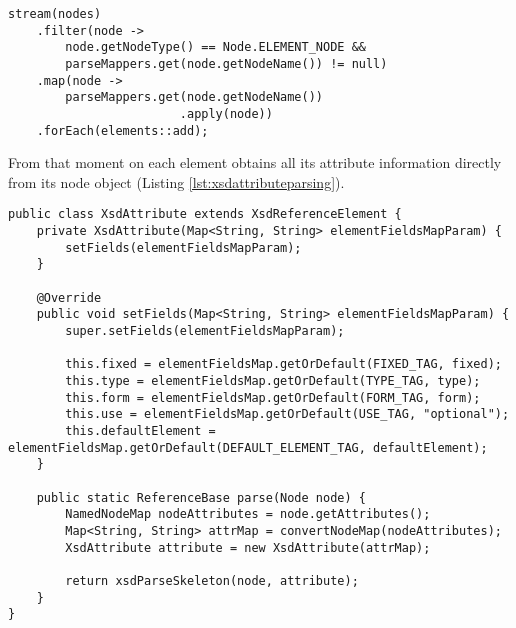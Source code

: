\medskip

\begin{minipage}{\linewidth}
\begin{lstlisting}[caption={XsdParser Node Parsing Process},captionpos=b,label={lst:nodeparsingprocess}]
stream(nodes)
    .filter(node -> 
        node.getNodeType() == Node.ELEMENT_NODE && 
        parseMappers.get(node.getNodeName()) != null)
    .map(node -> 
        parseMappers.get(node.getNodeName())
                        .apply(node))
    .forEach(elements::add);
\end{lstlisting}
\end{minipage}

\noindent
From that moment on each element obtains all its attribute information directly from its node object (Listing \ref{lst:xsdattributeparsing}). 

\medskip

\begin{minipage}{\linewidth}
\begin{lstlisting}[caption={XsdAttribute Information Extraction (Simplified)},captionpos=b,label={lst:xsdattributeparsing}]
public class XsdAttribute extends XsdReferenceElement {
    private XsdAttribute(Map<String, String> elementFieldsMapParam) {
        setFields(elementFieldsMapParam);
    }

    @Override
    public void setFields(Map<String, String> elementFieldsMapParam) {
        super.setFields(elementFieldsMapParam);

        this.fixed = elementFieldsMap.getOrDefault(FIXED_TAG, fixed);
        this.type = elementFieldsMap.getOrDefault(TYPE_TAG, type);
        this.form = elementFieldsMap.getOrDefault(FORM_TAG, form);
        this.use = elementFieldsMap.getOrDefault(USE_TAG, "optional");
        this.defaultElement = elementFieldsMap.getOrDefault(DEFAULT_ELEMENT_TAG, defaultElement);
    }
    
    public static ReferenceBase parse(Node node) {
        NamedNodeMap nodeAttributes = node.getAttributes();
        Map<String, String> attrMap = convertNodeMap(nodeAttributes);        
        XsdAttribute attribute = new XsdAttribute(attrMap);    
    
        return xsdParseSkeleton(node, attribute);
    }
}
\end{lstlisting}
\end{minipage}

